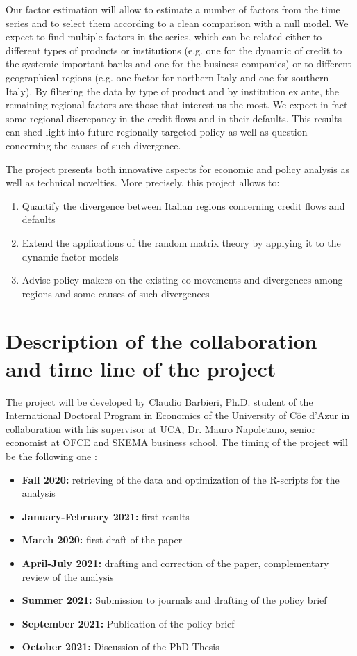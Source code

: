 \documentclass[a4paper,11pt]{article}
\begin{document}
Our factor estimation will allow to estimate a number of factors from the time series and to select them according to a clean comparison with a null model. We expect to find multiple factors in the series, which can be related either to different types of products or institutions (e.g. one for the dynamic of credit to the systemic important banks and one for the business companies) or to different geographical regions (e.g. one factor for northern Italy and one for southern Italy). By filtering the data by type of product and by institution ex ante, the remaining regional factors are those that interest us the most. We expect in fact some regional discrepancy in the credit flows and in their defaults. This results can shed light into future regionally targeted policy as well as question concerning the causes of such divergence. 

The project presents both innovative aspects for economic and policy analysis as well as technical novelties. More precisely, this project allows to:
\begin{enumerate}
	\item Quantify the divergence between Italian regions concerning credit flows and defaults
	\item Extend the applications of the random matrix theory by applying it to the dynamic factor models
	\item Advise policy makers on the existing co-movements and divergences among regions and some causes of such divergences
\end{enumerate}



\section{Description of the collaboration and time line of the project}
The project will be developed by Claudio Barbieri, Ph.D. student of the
International Doctoral Program in Economics of the University of C\^{o}e
d'Azur in collaboration with his supervisor at UCA, Dr. Mauro Napoletano, senior economist at 
OFCE and SKEMA business school. 
\noindent The timing of the project will be the following one :
\begin{itemize}
	\item \textbf{Fall 2020:} retrieving of the data and optimization of the R-scripts for the analysis
	\item \textbf{January-February 2021:} first results
	\item \textbf{March 2020:} first draft of the paper
	\item \textbf{April-July 2021:} drafting and correction of the paper, complementary review of the analysis 
	\item \textbf{Summer 2021:} Submission to journals and drafting of the policy brief
	\item \textbf{September 2021:} Publication of the policy brief
	\item \textbf{October 2021:} Discussion of the PhD Thesis
\end{itemize}
\end{document}
